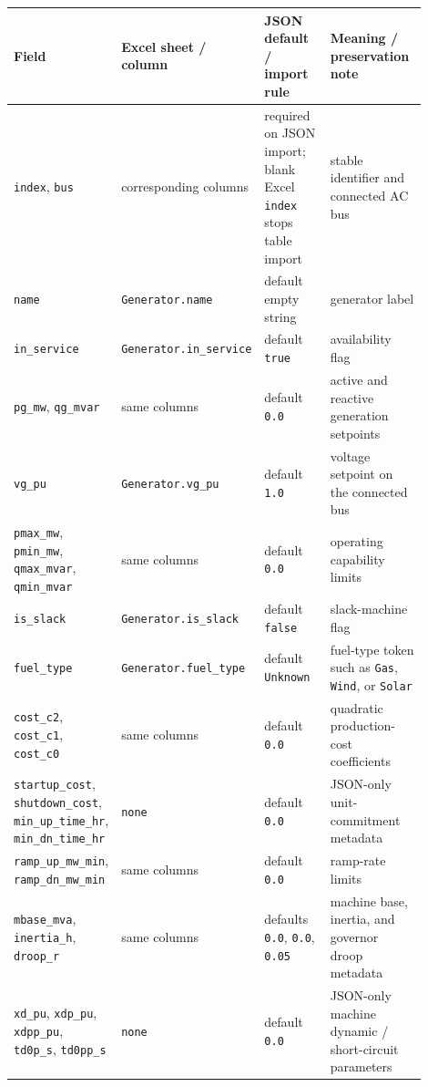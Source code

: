 \begin{longtable}{L{0.20\linewidth}L{0.24\linewidth}L{0.20\linewidth}L{0.26\linewidth}}
\toprule
Field & Excel sheet / column & JSON default / import rule & Meaning / preservation note \\
\midrule
\endhead
\texttt{index}, \texttt{bus} & corresponding columns & required on JSON import; blank Excel \texttt{index} stops table import & stable identifier and connected AC bus \\
\texttt{name} & \texttt{Generator.name} & default empty string & generator label \\
\texttt{in\_service} & \texttt{Generator.in\_service} & default \texttt{true} & availability flag \\
\texttt{pg\_mw}, \texttt{qg\_mvar} & same columns & default \texttt{0.0} & active and reactive generation setpoints \\
\texttt{vg\_pu} & \texttt{Generator.vg\_pu} & default \texttt{1.0} & voltage setpoint on the connected bus \\
\texttt{pmax\_mw}, \texttt{pmin\_mw}, \texttt{qmax\_mvar}, \texttt{qmin\_mvar} & same columns & default \texttt{0.0} & operating capability limits \\
\texttt{is\_slack} & \texttt{Generator.is\_slack} & default \texttt{false} & slack-machine flag \\
\texttt{fuel\_type} & \texttt{Generator.fuel\_type} & default \texttt{Unknown} & fuel-type token such as \texttt{Gas}, \texttt{Wind}, or \texttt{Solar} \\
\texttt{cost\_c2}, \texttt{cost\_c1}, \texttt{cost\_c0} & same columns & default \texttt{0.0} & quadratic production-cost coefficients \\
\texttt{startup\_cost}, \texttt{shutdown\_cost}, \texttt{min\_up\_time\_hr}, \texttt{min\_dn\_time\_hr} & \texttt{none} & default \texttt{0.0} & JSON-only unit-commitment metadata \\
\texttt{ramp\_up\_mw\_min}, \texttt{ramp\_dn\_mw\_min} & same columns & default \texttt{0.0} & ramp-rate limits \\
\texttt{mbase\_mva}, \texttt{inertia\_h}, \texttt{droop\_r} & same columns & defaults \texttt{0.0}, \texttt{0.0}, \texttt{0.05} & machine base, inertia, and governor droop metadata \\
\texttt{xd\_pu}, \texttt{xdp\_pu}, \texttt{xdpp\_pu}, \texttt{td0p\_s}, \texttt{td0pp\_s} & \texttt{none} & default \texttt{0.0} & JSON-only machine dynamic / short-circuit parameters \\

\end{longtable}
